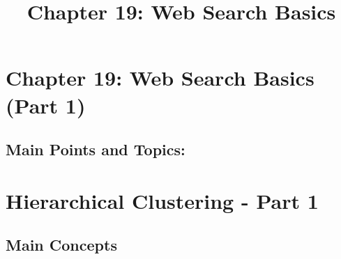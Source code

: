 \documentclass{article}
\title{Chapter 19: Web Search Basics}
\author{}
\date{}
\begin{document}
\maketitle
\section*{Chapter 19: Web Search Basics (Part 1)}

\subsection*{Main Points and Topics:}

\section{Hierarchical Clustering - Part 1}

\subsection{Main Concepts}
\end{document}
